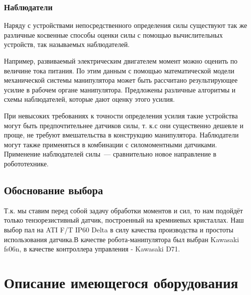\documentclass[a4paper,14pt,russian]{extreport} \usepackage{extsizes}
\begin{document}
	\subsection {Наблюдатели}
	Наряду с устройствами непосредственного определения силы
	существуют так же различные косвенные способы оценки силы с помощью вычислительных устройств, так называемых наблюдателей.
	
	Например, развиваемый электрическим двигателем момент можно
	оценить по величине тока питания. По этим данным с помощью
	математической модели механической системы манипулятора
	может быть рассчитано результирующее усилие в рабочем органе
	манипулятора. Предложены различные алгоритмы и схемы наблюдателей, которые дают оценку этого усилия.
	
	При невысоких требованиях к точности определения усилия
	такие устройства могут быть предпочтительнее датчиков силы, т. к.с 
	они существенно дешевле и проще, не требуют вмешательства
	в конструкцию манипулятора. Наблюдатели могут также применяться в комбинации с силомоментными датчиками.
	Применение наблюдателей силы~--- сравнительно новое направление в робототехнике.
	\section {Обоснование выбора}
	Т.к. мы ставим перед собой задачу обработки моментов и сил, то
	нам подойдёт только тензорезистивный датчик, построенный на кремниевых кристаллах. Наш выбор пал на ATI F/T IP60 Delta в силу качества производства и простоты использования датчика.В качестве робота-манипулятора был выбран Kawasaki fs06n, в качестве контроллера управления - Kawasaki D71.
	\chapter {Описание имеющегося оборудования}	
\end{document}
